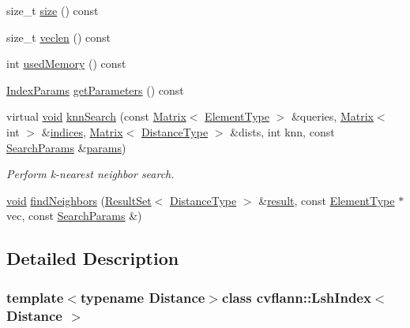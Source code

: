 \begin{DoxyCompactItemize}
size\-\_\-t \hyperlink{classcvflann_1_1LshIndex_a474fe6952d9ca8699c1c36b80ad15f05}{size} () const 
\item 
size\-\_\-t \hyperlink{classcvflann_1_1LshIndex_acdd5815793d1584b45615cdf075b3580}{veclen} () const 
\item 
int \hyperlink{classcvflann_1_1LshIndex_a30c7b5e70fceada2800db7357fa66259}{used\-Memory} () const 
\item 
\hyperlink{namespacecvflann_a742b4c7076c21012054af74a9ee48289}{Index\-Params} \hyperlink{classcvflann_1_1LshIndex_ae3eb8aa78a0b2e38baf0d89651b9b69a}{get\-Parameters} () const 
\item 
virtual \hyperlink{legacy_8hpp_a8bb47f092d473522721002c86c13b94e}{void} \hyperlink{classcvflann_1_1LshIndex_a82b5dd8af0ae2cbad219a42a66bcccbf}{knn\-Search} (const \hyperlink{classcvflann_1_1Matrix}{Matrix}$<$ \hyperlink{classcvflann_1_1LshIndex_a2f042ae6416a2a78d1d9a7f622d1e284}{Element\-Type} $>$ \&queries, \hyperlink{classcvflann_1_1Matrix}{Matrix}$<$ int $>$ \&\hyperlink{legacy_8hpp_a3e3b9b48bcbc7f460efbcfe4399ad24a}{indices}, \hyperlink{classcvflann_1_1Matrix}{Matrix}$<$ \hyperlink{classcvflann_1_1LshIndex_aed0c5e217eff759f37ef2b91a9ddaae6}{Distance\-Type} $>$ \&dists, int knn, const \hyperlink{structcvflann_1_1SearchParams}{Search\-Params} \&\hyperlink{compat_8hpp_a0480a03ecc41b20cde376602531d9270}{params})
\begin{DoxyCompactList}\small\item\em Perform k-\/nearest neighbor search. \end{DoxyCompactList}\item 
\hyperlink{legacy_8hpp_a8bb47f092d473522721002c86c13b94e}{void} \hyperlink{classcvflann_1_1LshIndex_acde2974de8a4b2cfe72d849fdabddee9}{find\-Neighbors} (\hyperlink{classcvflann_1_1ResultSet}{Result\-Set}$<$ \hyperlink{classcvflann_1_1LshIndex_aed0c5e217eff759f37ef2b91a9ddaae6}{Distance\-Type} $>$ \&\hyperlink{legacy_8hpp_a0bb77d54f6769867cfdf389897bd8e43}{result}, const \hyperlink{classcvflann_1_1LshIndex_a2f042ae6416a2a78d1d9a7f622d1e284}{Element\-Type} $\ast$vec, const \hyperlink{structcvflann_1_1SearchParams}{Search\-Params} \&)
\end{DoxyCompactItemize}


\subsection{Detailed Description}
\subsubsection*{template$<$typename Distance$>$class cvflann\-::\-Lsh\-Index$<$ Distance $>$}

